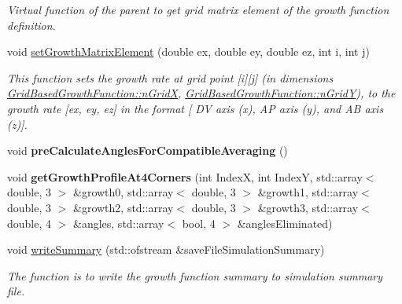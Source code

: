 \begin{DoxyCompactItemize}
\begin{DoxyCompactList}\small\item\em Virtual function of the parent to get grid matrix element of the growth function definition. \end{DoxyCompactList}\item 
\hypertarget{classGridBasedGrowthFunction_a9d01fcbba5732aad966659d4f64c145b}{}void \hyperlink{classGridBasedGrowthFunction_a9d01fcbba5732aad966659d4f64c145b}{set\+Growth\+Matrix\+Element} (double ex, double ey, double ez, int i, int j)\label{classGridBasedGrowthFunction_a9d01fcbba5732aad966659d4f64c145b}

\begin{DoxyCompactList}\small\item\em This function sets the growth rate at grid point \mbox{[}i\mbox{]}\mbox{[}j\mbox{]} (in dimensions \hyperlink{classGridBasedGrowthFunction_a6d36f433ad29dd4f36352900d3795469}{Grid\+Based\+Growth\+Function\+::n\+Grid\+X}, \hyperlink{classGridBasedGrowthFunction_ac992521b24e1975df1c7372c11285217}{Grid\+Based\+Growth\+Function\+::n\+Grid\+Y}), to the growth rate \mbox{[}ex, ey, ez\mbox{]} in the format \mbox{[} D\+V axis (x), A\+P axis (y), and A\+B axis (z)\mbox{]}. \end{DoxyCompactList}\item 
\hypertarget{classGridBasedGrowthFunction_a92f4db6ab17ba3539f98895c500ec2d7}{}void {\bfseries pre\+Calculate\+Angles\+For\+Compatible\+Averaging} ()\label{classGridBasedGrowthFunction_a92f4db6ab17ba3539f98895c500ec2d7}

\item 
\hypertarget{classGridBasedGrowthFunction_adaa4c31c1007e1d803c300ff08e1bc45}{}void {\bfseries get\+Growth\+Profile\+At4\+Corners} (int Index\+X, int Index\+Y, std\+::array$<$ double, 3 $>$ \&growth0, std\+::array$<$ double, 3 $>$ \&growth1, std\+::array$<$ double, 3 $>$ \&growth2, std\+::array$<$ double, 3 $>$ \&growth3, std\+::array$<$ double, 4 $>$ \&angles, std\+::array$<$ bool, 4 $>$ \&angles\+Eliminated)\label{classGridBasedGrowthFunction_adaa4c31c1007e1d803c300ff08e1bc45}

\item 
void \hyperlink{classGridBasedGrowthFunction_aedd193c0a471de21545788c51f253de0}{write\+Summary} (std\+::ofstream \&save\+File\+Simulation\+Summary)
\begin{DoxyCompactList}\small\item\em The function is to write the growth function summary to simulation summary file. \end{DoxyCompactList}\end{DoxyCompactItemize}
